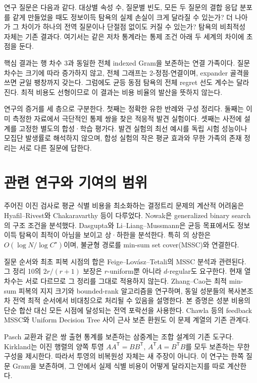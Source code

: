\documentclass[11pt,a4paper]{article}
\theoremstyle{definition}
\theoremstyle{remark}\newtheorem{remark}[theorem]{주석}
\newcommand{\Opt}{C^{\star}}
\begin{document}
연구 질문은 다음과 같다. 대상별 속성 수, 질문별 빈도, 모든 두 질문의 결합 응답 분포를 같게 만들었을 때도 정보이득 탐욕의 실제 손실이 크게 달라질 수 있는가? 더 나아가 그 차이가 하나의 전역 질문이나 단절점 없이도 커질 수 있는가? 탐욕의 비최적성 자체는 기존 결과다\cite{dasgupta,llm}. 여기서는 같은 저차 통계라는 통제 조건 아래 두 세계의 차이에 초점을 둔다.

핵심 결과는 행 차수 3과 동일한 전체 indexed Gram을 보존하는 연결 가족이다. 질문 차수는 크기에 따라 증가하지 않고, 전체 그래프는 2-정점-연결이며, expander 골격을 쓰면 균일 팽창까지 갖는다. 그럼에도 균등 동점 탐욕의 전체 regret 선도 계수는 달라진다. 최적 비용도 선형이므로 이 결과는 비용 비율의 발산을 뜻하지 않는다.

연구의 증거를 세 층으로 구분한다. 첫째는 정확한 유한 반례와 구성 정리다. 둘째는 이미 측정한 자료에서 극단적인 통제 쌍을 찾은 적응적 발견 실험이다. 셋째는 사전에 설계를 고정한 별도의 합성·학습 평가다. 발견 실험의 최선 예시를 독립 시험 성능이나 모집단 발생률로 해석하지 않으며, 합성 실험의 작은 평균 효과와 무한 가족의 존재 정리는 서로 다른 질문에 답한다.

\section{관련 연구와 기여의 범위}
주어진 이진 검사로 평균 식별 비용을 최소화하는 결정트리 문제의 계산적 어려움은 Hyafil--Rivest\cite{hyafil}와 Chakaravarthy 등\cite{chakaravarthy}이 다루었다. Nowak\cite{nowak}은 generalized binary search의 구조 조건을 분석했다. Dasgupta\cite{dasgupta}와 Li--Liang--Mussmann\cite{llm}은 균등 목표에서도 정보이득 탐욕이 최적이 아님을 보이고 상·하한을 분석한다. 특히 \cite{llm}의 상한은 $O(\log N/\log\Opt)$이며, 불균형 경로를 min-sum set cover(MSSC)와 연결한다.

질문 순서와 최초 피복 시점의 합은 Feige--Lovász--Tetali\cite{flt}의 MSSC 분석과 관련된다. 그 정리 10의 $2r/(r+1)$ 보장은 $r$-uniform뿐 아니라 $d$-regular도 요구한다. 현재 열 차수는 서로 다르므로 그 정리를 그대로 적용하지 않는다. Zhang--Cao\cite{zhangcao}는 최적 min-sum 피복의 지지 크기와 bounded-rank 알고리즘을 연구하며, 동일 성분들의 복사본조차 전역 최적 순서에서 비대칭으로 처리될 수 있음을 설명한다. 본 증명은 성분 비용의 단순 합산 대신 모든 시점에 달성되는 전역 포락선을 사용한다. Chawla 등\cite{pandora}의 feedback MSSC와 Uniform Decision Tree 사이 근사 보존 환원도 이 문제 계열의 기존 관계다.

Pasch 교환과 같은 쌍 출현 통계를 보존하는 삼중계는 조합 설계의 기존 도구다\cite{grannell}. Kirkland\cite{kirkland}는 이진 행렬의 양쪽 투영 $AA^{\mathsf T}=BB^{\mathsf T}$, $A^{\mathsf T}A=B^{\mathsf T}B$를 모두 보존하는 무한 구성을 제시한다. 따라서 투영의 비복원성 자체는 새 주장이 아니다. 이 연구는 한쪽 질문 Gram을 보존하며, 그 안에서 실제 식별 비용이 어떻게 달라지는지를 따로 계산한다.
\end{document}
